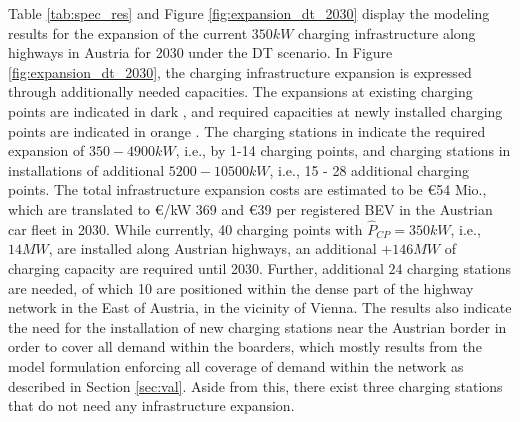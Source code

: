 \documentclass[journal,article,submit,pdftex,moreauthors]{Definitions/mdpi}
\begin{document}
Table \ref{tab:spec_res} and Figure \ref{fig:expansion_dt_2030} display the modeling results for the expansion of the current $350kW$ charging infrastructure along highways in Austria for 2030 under the DT scenario. In Figure \ref{fig:expansion_dt_2030}, the charging infrastructure expansion is expressed through additionally needed capacities. The expansions at existing charging points are indicated in dark , and required capacities at newly installed charging points are indicated in orange . The charging stations in  indicate the required expansion of $350 - 4900 kW$, i.e., by 1-14 charging points, and charging stations in  installations of additional $5200 - 10500 kW$, i.e., 15 - 28 additional charging points. The total infrastructure expansion costs are estimated to be €54 Mio., which are translated to €/kW 369 and €39 per registered BEV in the Austrian car fleet in 2030. While currently, 40 charging points with $\hat{P}_{CP}=350 kW$, i.e., $14 MW$, are  installed along Austrian highways, an additional $+146 MW$ of charging capacity are required until 2030. Further, additional $24$ charging stations are needed, of which 10 are positioned within the dense part of the highway network in the East of Austria, in the vicinity of Vienna. The results also indicate the need for the installation of new charging stations near the Austrian border in order to cover all demand within the boarders, which mostly results from the model formulation enforcing all coverage of demand within the network as described in Section \ref{sec:val}. Aside from this, there exist three charging stations that do not need any infrastructure expansion.

\end{document}
